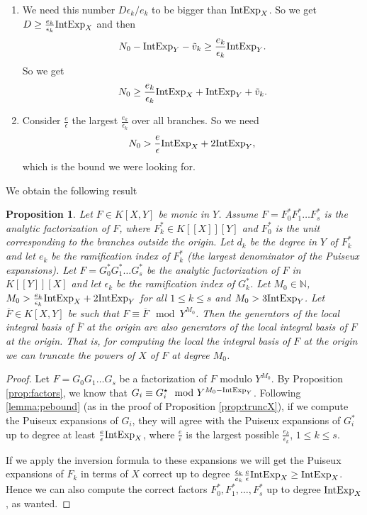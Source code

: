 \documentclass[a4paper,11pt,reqno]{amsart}%
\theoremstyle{definition}
\theoremstyle{plain}
\newtheorem{proposition}[definition]{Proposition}
\theoremstyle{remark}
\newcommand{\N}{{\mathbb N}}
\newcommand\ct[1]{\text{\rmfamily\upshape #1}}
\newcommand{\IntExpX}{\ct{IntExp}_X}
\newcommand{\IntExpY}{\ct{IntExp}_Y}
\begin{document}
\begin{enumerate}
\item We need this number $D \epsilon_k / e_k$ to be bigger than $\IntExpX$. So we get $D \ge \frac{e_k}{\epsilon_k}\IntExpX$ and then
$$N_0 - \IntExpY - \tilde v_k \ge \frac{e_k}{\epsilon_k} \IntExpY.$$
So we get
$$N_0 \ge \frac{e_k}{\epsilon_k}\IntExpX + \IntExpY + \tilde v_k.$$
\item Consider $\frac{e}{\epsilon}$ the largest $\frac{e_k}{\epsilon_k}$ over all branches. So we need
$$N_0 > \frac{e}{\epsilon} \IntExpX + 2 \IntExpY,$$
which is the bound we were looking for.

\end{enumerate}

We obtain the following result

\begin{proposition}
\label{prop:truncY}
Let $F \in K[X,Y]$ be monic in $Y$. Assume $F = F_0^* F_1^* \dots F_s^*$ is the analytic factorization of $F$, where $F_k^* \in K[[X]][Y]$ and $F_0^*$ is the unit corresponding to the branches outside the origin. Let $d_k$ be the degree in $Y$ of $F_k^*$ and let $e_k$ be the ramification index of $F_k^*$ (the largest denominator of the Puiseux expansions). Let $F = G_0^* G_1^* \dots G_s^*$ be the analytic factorization of $F$ in $K[[Y]][X]$ and let $\epsilon_k$ be the ramification index of $G_k^*$. Let $M_0 \in \N$, $M_0 > \frac{e_k}{\epsilon_k} \IntExpX + 2 \IntExpY$ for all $1 \le k \le s$ and $M_0 > 3 \IntExpY$. Let $\overline F \in K[X,Y]$ be such that $F \equiv \overline{F} \mod Y^{M_0}$. Then the generators of the local integral basis of $\overline F$ at the origin are also generators of the local integral basis of $F$ at the origin. That is, for computing the local the integral basis of $F$ at the origin we can truncate the powers of $X$ of $F$ at degree $M_0$.
\end{proposition}

\begin{proof} Let $F = G_0 G_1 \dots G_s$ be a factorization of $F$ modulo $Y^{M_0}$.
By Proposition \ref{prop:factors}, we know that $G_i \equiv G_i^\star \mod Y^{M_0 - \IntExpY}$.
Following \ref{lemma:pebound} (as in the proof of Proposition \ref{prop:truncX}), if we compute the Puiseux expansions of $G_i$, they will agree with the Puiseux expansions of $G^*_i$ up to degree at least $\frac{e}{\epsilon} \IntExpX$, where $\frac{e}{\epsilon}$ is the largest possible $\frac{e_k}{\epsilon_k}$, $1 \le k \le s$.

If we apply the inversion formula to these expansions we will get the Puiseux expansions of $F_k$ in terms of $X$ correct up to degree $\frac{\epsilon_k}{e_k} \frac{e}{\epsilon} \IntExpX \ge \IntExpX$. Hence we can also compute the correct factors $F_0^*, F_1^*, \dots, F_s^*$ up to degree $\IntExpX$, as wanted.
\end{proof}
\end{document}
